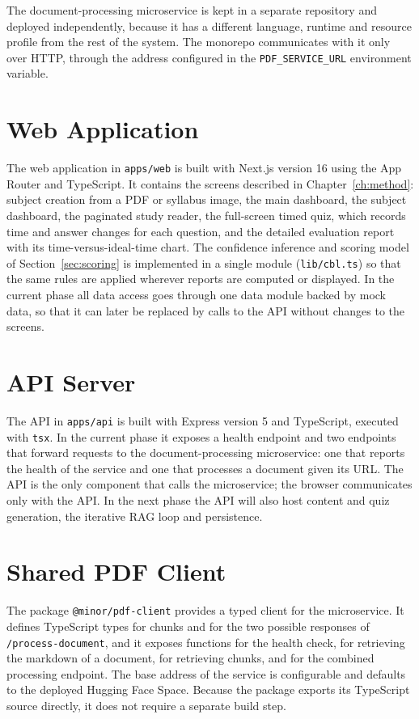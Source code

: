\documentclass[12pt,a4paper,oneside]{report}
\begin{document}
The document-processing microservice is kept in a separate repository and
deployed independently, because it has a different language, runtime and
resource profile from the rest of the system. The monorepo communicates
with it only over HTTP, through the address configured in the
\texttt{PDF\_SERVICE\_URL} environment variable.

\section{Web Application}

The web application in \texttt{apps/web} is built with Next.js
\cite{nextjs} version 16 using the App Router and TypeScript. It
contains the screens described in Chapter~\ref{ch:method}: subject
creation from a PDF or syllabus image, the main dashboard, the subject
dashboard, the paginated study reader, the full-screen timed quiz, which
records time and answer changes for each question, and the detailed
evaluation report with its time-versus-ideal-time chart. The confidence
inference and scoring model of Section~\ref{sec:scoring} is implemented in
a single module (\texttt{lib/cbl.ts}) so that the same rules are applied wherever reports are computed or
displayed. In the current phase all data access goes through one data
module backed by mock data, so that it can later be replaced by calls to
the API without changes to the screens.

\section{API Server}

The API in \texttt{apps/api} is built with Express \cite{express} version 5
and TypeScript, executed with \texttt{tsx}. In the current phase it
exposes a health endpoint and two endpoints that forward requests to the
document-processing microservice: one that reports the health of the
service and one that processes a document given its URL. The API is the
only component that calls the microservice; the browser communicates only
with the API. In the next phase the API will also host content and quiz
generation, the iterative RAG loop and persistence.

\section{Shared PDF Client}

The package \texttt{@minor/pdf-client} provides a typed client for the
microservice. It defines TypeScript types for chunks and for the two
possible responses of \texttt{/process-document}, and it exposes functions
for the health check, for retrieving the markdown of a document, for
retrieving chunks, and for the combined processing endpoint. The base
address of the service is configurable and defaults to the deployed Hugging
Face Space. Because the package exports its TypeScript source directly, it
does not require a separate build step.
\end{document}
